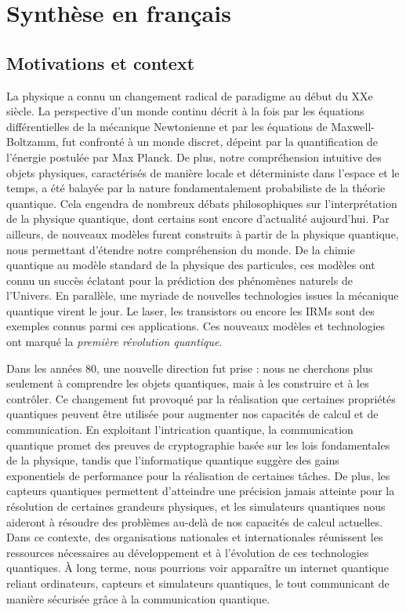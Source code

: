 \chapter{Synthèse en français}

\section{Motivations et context}

La physique a connu un changement radical de paradigme au début du XXe siècle.
La perspective d'un monde continu décrit à la fois par les équations différentielles de la mécanique Newtonienne et par les équations de Maxwell-Boltzamm, fut confronté à un monde discret, dépeint par la quantification de l'énergie postulée par Max Planck.
De plus, notre compréhension intuitive des objets physiques, caractérisés de manière locale et déterministe dans l'espace et le temps, a été balayée par la nature fondamentalement probabiliste de la théorie quantique.
Cela engendra de nombreux débats philosophiques sur l'interprétation de la physique quantique, dont certains sont encore d'actualité aujourd'hui.
Par ailleurs, de nouveaux modèles furent construits à partir de la physique quantique, nous permettant d'étendre notre compréhension du monde.
De la chimie quantique au modèle standard de la physique des particules, ces modèles ont connu un succès éclatant pour la prédiction des phénomènes naturels de l'Univers.
En parallèle, une myriade de nouvelles technologies issues la mécanique quantique virent le jour.
Le laser, les transistors ou encore les IRMs sont des exemples connus parmi ces applications.
Ces nouveaux modèles et technologies ont marqué la \textit{première révolution quantique}.

\medbreak

Dans les années 80, une nouvelle direction fut prise : nous ne cherchons plus seulement à comprendre les objets quantiques, mais à les construire et à les contrôler.
Ce changement fut provoqué par la réalisation que certaines propriétés quantiques peuvent être utilisée pour augmenter nos capacités de calcul et de communication.
En exploitant l'intrication quantique, la communication quantique promet des preuves de cryptographie basée sur les lois fondamentales de la physique, tandis que l'informatique quantique suggère des gains exponentiels de performance pour la réalisation de certaines tâches.
De plus, les capteurs quantiques permettent d'atteindre une précision jamais atteinte pour la résolution de certaines grandeurs physiques, et les simulateurs quantiques nous aideront à résoudre des problèmes au-delà de nos capacités de calcul actuelles.
Dans ce contexte, des organisations nationales et internationales réunissent les ressources nécessaires au développement et à l'évolution de ces technologies quantiques.
À long terme, nous pourrions voir apparaître un internet quantique reliant ordinateurs, capteurs et simulateurs quantiques, le tout communicant de manière sécurisée grâce à la communication quantique.

